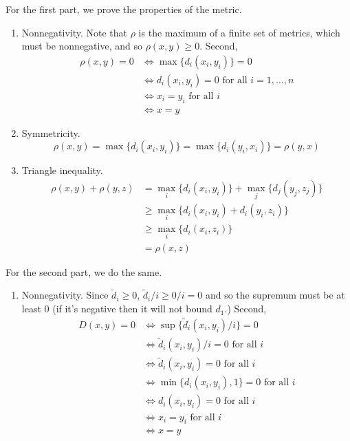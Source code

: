   \begin{solution}
    For the first part, we prove the properties of the metric. 
    \begin{enumerate}
      \item Nonnegativity. Note that $\rho$ is the maximum of a finite set of metrics, which must be nonnegative, and so $\rho(x, y) \geq 0$. Second,  
      \begin{align}
        \rho(x, y) = 0 & \iff \max\{d_i (x_i, y_i)\} = 0 \\
                       & \iff d_i (x_i, y_i) = 0 \text{ for all } i = 1, \ldots, n  \\
                       & \iff x_i = y_i \text{ for all } i \\
                       & \iff x = y
      \end{align}

      \item Symmetricity. 
      \begin{equation}
        \rho(x, y) = \max\{d_i (x_i, y_i)\} = \max\{d_i (y_i, x_i)\} = \rho(y, x)
      \end{equation}

      \item Triangle inequality. 
      \begin{align}
        \rho(x, y) + \rho(y, z) & = \max_i \{d_i (x_i, y_i)\} + \max_j \{d_j (y_j, z_j)\} \\
                                & \geq \max_i \{ d_i (x_i, y_i) + d_i (y_i, z_i) \} \\
                                & \geq \max_i \{ d_i (x_i, z_i) \} \\
                                & = \rho(x, z)
      \end{align}
    \end{enumerate} 
    
    For the second part, we do the same. 
    \begin{enumerate}
      \item Nonnegativity. Since $\tilde{d}_i \geq 0$, $\tilde{d}_i / i \geq 0/i = 0$ and so the supremum must be at least $0$ (if it's negative then it will not bound $d_1$.) Second, 
        \begin{align}
          D(x, y) = 0 & \iff \sup\{\tilde{d}_i (x_i, y_i) / i \} = 0 \\
                      & \iff \tilde{d}_i (x_i, y_i) / i = 0 \text{ for all } i \\
                      & \iff \tilde{d}_i (x_i, y_i) = 0 \text{ for all } i \\
                      & \iff \min\{d_i (x_i, y_i), 1 \} = 0 \text{ for all } i \\ 
                      & \iff d_i (x_i, y_i) = 0 \text{ for all } i \\
                      & \iff x_i = y_i \text{ for all } i \\
                      & \iff x = y
        \end{align}


\end{enumerate}
\end{solution}
